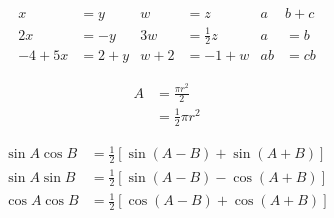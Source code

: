 \documentclass[a4paper]{article}
\begin{document}
\begin{align*}
x&=y   & w &=z           & a&b+c\\
2x&=-y & 3w&=\frac{1}{2}z & a&=b\\
-4+5x&=2+y & w+2&=-1+w & ab&=cb 
\end{align*}

\begin{equation}
\begin{split}
A &= \frac{\pi r^2}{2} \\
& = \frac{1}{2} \pi r^2
\end{split}
\end{equation}

\begin{align*}
\sin A \cos B &= \frac{1}{2}\left[ \sin(A-B) + \sin(A+B)\right] \\
\sin A \sin B &= \frac{1}{2}\left[ \sin(A-B) - \cos(A+B)\right] \\
\cos A \cos B &= \frac{1}{2}\left[ \cos(A-B) + \cos(A+B)\right] \\
\end{align*}
\end{document}
